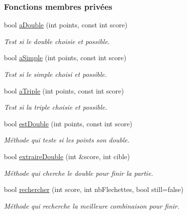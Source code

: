 \subsubsection*{Fonctions membres privées}
\begin{DoxyCompactItemize}
\item 
bool \hyperlink{class_solution_ad79929c887a394883a154ea2ca9c3aac}{a\+Double} (int points, const int score)
\begin{DoxyCompactList}\small\item\em Test si le double choisie et possible. \end{DoxyCompactList}\item 
bool \hyperlink{class_solution_a932ab2aea629d049202e8f8e38cc01b3}{a\+Simple} (int points, const int score)
\begin{DoxyCompactList}\small\item\em Test si le simple choisi et possible. \end{DoxyCompactList}\item 
bool \hyperlink{class_solution_af8062e8e2997f8a7451e439ce23dd544}{a\+Triple} (int points, const int score)
\begin{DoxyCompactList}\small\item\em Test si la triple choisie et possible. \end{DoxyCompactList}\item 
bool \hyperlink{class_solution_add9d51c9612fa89361df0908e10779b8}{est\+Double} (int points, const int score)
\begin{DoxyCompactList}\small\item\em Méthode qui teste si les points son double. \end{DoxyCompactList}\item 
bool \hyperlink{class_solution_a34c3bf5ce00cdf428f2e07741806499d}{extraire\+Double} (int \&score, int cible)
\begin{DoxyCompactList}\small\item\em Méthode qui cherche le double pour finir la partie. \end{DoxyCompactList}\item 
bool \hyperlink{class_solution_a857b1b362fc0d5eb08e2eb7302dce27f}{rechercher} (int score, int nb\+Flechettes, bool still=false)
\begin{DoxyCompactList}\small\item\em Méthode qui recherche la meilleure combinaison pour finir. \end{DoxyCompactList}\item 

\end{DoxyCompactItemize}
